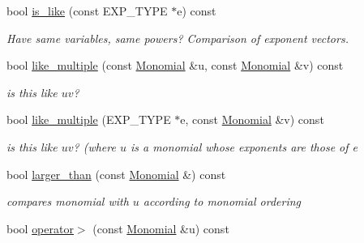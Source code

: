 \begin{Indent}
\begin{DoxyCompactItemize}
\mbox{\label{group__polygroup_ac68d2650242d00ab6c26c3f01f31414a}} 
bool \hyperlink{group__polygroup_ac68d2650242d00ab6c26c3f01f31414a}{is\+\_\+like} (const E\+X\+P\+\_\+\+T\+Y\+PE $\ast$e) const
\begin{DoxyCompactList}\small\item\em Have same variables, same powers? Comparison of exponent vectors. \end{DoxyCompactList}\item 
\mbox{\label{group__polygroup_adec4a37e9e36f821ae69ca00eb087961}} 
bool \hyperlink{group__polygroup_adec4a37e9e36f821ae69ca00eb087961}{like\+\_\+multiple} (const \hyperlink{group__polygroup_class_monomial}{Monomial} \&u, const \hyperlink{group__polygroup_class_monomial}{Monomial} \&v) const
\begin{DoxyCompactList}\small\item\em is {\ttfamily this} like $uv$? \end{DoxyCompactList}\item 
\mbox{\label{group__polygroup_ab2989052f946017870269c19b2108b55}} 
bool \hyperlink{group__polygroup_ab2989052f946017870269c19b2108b55}{like\+\_\+multiple} (E\+X\+P\+\_\+\+T\+Y\+PE $\ast$e, const \hyperlink{group__polygroup_class_monomial}{Monomial} \&v) const
\begin{DoxyCompactList}\small\item\em is {\ttfamily this} like $uv$? (where $u$ is a monomial whose exponents are those of {\ttfamily e} \end{DoxyCompactList}\item 
\mbox{\label{group__polygroup_ab50a4f90c210bcaf6e21fc16028a121a}} 
bool \hyperlink{group__polygroup_ab50a4f90c210bcaf6e21fc16028a121a}{larger\+\_\+than} (const \hyperlink{group__polygroup_class_monomial}{Monomial} \&) const
\begin{DoxyCompactList}\small\item\em compares monomial with $u$ according to monomial ordering \end{DoxyCompactList}\item 
\mbox{\label{group__polygroup_ad660e085a10e15ba0e13bcd9790994d0}} 
bool \hyperlink{group__polygroup_ad660e085a10e15ba0e13bcd9790994d0}{operator$>$} (const \hyperlink{group__polygroup_class_monomial}{Monomial} \&u) const

\end{DoxyCompactItemize}
\end{Indent}
